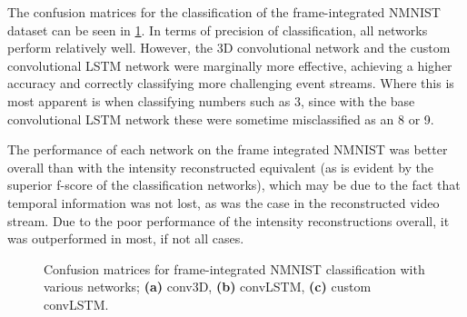 The confusion matrices for the classification of the frame-integrated  NMNIST dataset can be seen in \cref{fig:nmnist_c_matrices}. In terms of precision of classification, all networks perform relatively well. However, the 3D convolutional network and the custom convolutional LSTM network were marginally more effective, achieving a higher accuracy and correctly classifying more challenging event streams. Where this is most apparent is when classifying numbers such as 3, since with the base convolutional LSTM network these were sometime misclassified as an 8 or 9.

The performance of each network on the frame integrated NMNIST was better overall than with the intensity reconstructed equivalent (as is evident by the superior f-score of the classification networks), which may be due to the fact that temporal information was not lost, as was the case in the reconstructed video stream. Due to the poor performance of the intensity reconstructions overall, it was outperformed in most, if not all cases.

\begin{figure}[htb]%
    \centering
    \qquad
    \qquad
    \caption{Confusion matrices for frame-integrated NMNIST classification with various networks; \textbf{(a)} conv3D, \textbf{(b)} convLSTM, \textbf{(c)} custom convLSTM.}%
    \label{fig:nmnist_c_matrices}%
\end{figure}

